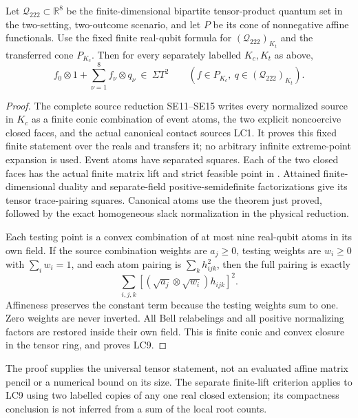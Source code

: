 \begin{corollary}
Let \(\mathcal Q_{222}\subset\mathbb R^8\) be the finite-dimensional
bipartite tensor-product quantum set in the two-setting,
two-outcome scenario, and let \(P\) be its cone of nonnegative
affine functionals.  Use the fixed finite real-qubit formula
for \((\mathcal Q_{222})_{K_t}\) and the transferred cone
\(P_{K_c}\).  Then for every separately labelled \(K_c,K_t\)
as above,
\[
 f_0\otimes1+\sum_{\nu=1}^8 f_\nu\otimes q_\nu
       \ \in\ \Sigma T^2
 \qquad
 (f\in P_{K_c},\ q\in(\mathcal Q_{222})_{K_t}).
\tag{LC9}
\]
\end{corollary}

\begin{proof}
The complete source reduction SE11--SE15 writes every normalized
source in \(K_c\) as a finite conic combination of event atoms,
the two explicit noncoercive closed faces, and the actual
canonical contact sources LC1.  It proves this fixed finite
statement over the reals and transfers it; no arbitrary
infinite extreme-point expansion is used.
Event atoms have separated squares.  Each of the two closed
faces has the actual finite matrix lift and strict feasible
point in .
Attained finite-dimensional duality and separate-field
positive-semidefinite factorizations give its tensor
trace-pairing squares.  Canonical atoms use the theorem
just proved, followed by the exact homogeneous slack
normalization in the physical reduction.

Each testing point is a convex combination of at most nine
real-qubit atoms in its own field.  If the source combination
weights are \(a_j\geq0\), testing weights are \(w_i\geq0\)
with \(\sum_iw_i=1\), and each atom pairing is
\(\sum_k h_{ijk}^2\), then the full pairing is exactly
\[
       \sum_{i,j,k}
        \left[(\sqrt{a_j}\otimes\sqrt{w_i})h_{ijk}\right]^2 .
\tag{LC10}
\]
Affineness preserves the constant term because the testing
weights sum to one.  Zero weights are never inverted.
All Bell relabelings and all positive normalizing factors
are restored inside their own field.  This is finite conic
and convex closure in the tensor ring, and proves LC9.
\end{proof}

The proof supplies the universal tensor statement, not an
evaluated affine matrix pencil or a numerical bound on its
size.  The separate finite-lift criterion applies to LC9
using two labelled copies of any one real closed extension;
its compactness conclusion is not inferred from a sum of
the local root counts.
